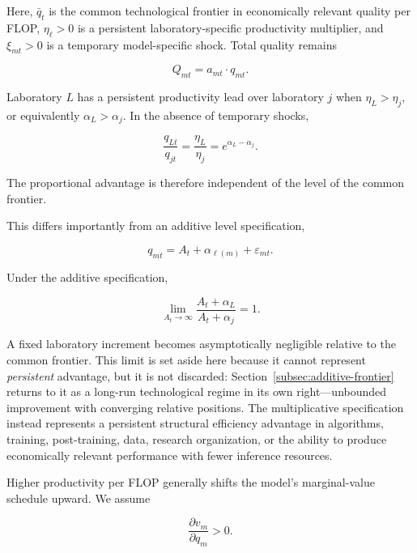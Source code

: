 \documentclass[11pt]{article}
\begin{document}
Here, $\bar q_t$ is the common technological frontier in economically relevant quality per FLOP, $\eta_\ell>0$ is a persistent laboratory-specific productivity multiplier, and $\xi_{mt}>0$ is a temporary model-specific shock. Total quality remains

\begin{equation}Q_{mt}=a_{mt}\cdot q_{mt}.\end{equation}

Laboratory $L$ has a persistent productivity lead over laboratory $j$ when $\eta_L>\eta_j$, or equivalently $\alpha_L>\alpha_j$. In the absence of temporary shocks,

\begin{equation}\frac{q_{Lt}}{q_{jt}}=\frac{\eta_L}{\eta_j}=e^{\alpha_L-\alpha_j}.\end{equation}

The proportional advantage is therefore independent of the level of the common frontier.

This differs importantly from an additive level specification,

\begin{equation}q_{mt}=A_t+\alpha_{\ell(m)}+\varepsilon_{mt}.\end{equation}

Under the additive specification,

\begin{equation}\lim_{A_t\rightarrow\infty}\frac{A_t+\alpha_L}{A_t+\alpha_j}=1.\end{equation}

A fixed laboratory increment becomes asymptotically negligible relative to the common frontier. This limit is set aside here because it cannot represent \emph{persistent} advantage, but it is not discarded: Section~\ref{subsec:additive-frontier} returns to it as a long-run technological regime in its own right---unbounded improvement with converging relative positions. The multiplicative specification instead represents a persistent structural efficiency advantage in algorithms, training, post-training, data, research organization, or the ability to produce economically relevant performance with fewer inference resources.

Higher productivity per FLOP generally shifts the model's marginal-value schedule upward. We assume

\begin{equation}\frac{\partial v_m}{\partial q_m}>0.\end{equation}
\end{document}
